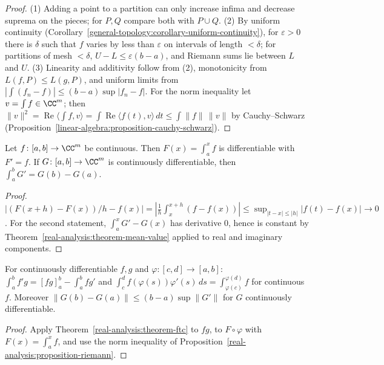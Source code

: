 \begin{proof}
(1) Adding a point to a partition can only increase infima and decrease suprema on the pieces; for $P, Q$ compare both with $P \cup Q$. (2) By uniform continuity
(Corollary~\ref{general-topology:corollary-uniform-continuity}), for $\varepsilon > 0$ there is $\delta$ such that $f$ varies by less than $\varepsilon$ on intervals of length $< \delta$; for partitions of mesh
$< \delta$, $U - L \leq \varepsilon(b - a)$, and Riemann sums lie between $L$ and $U$. (3) Linearity and additivity follow from (2), monotonicity from $L(f, P) \leq L(g, P)$, and uniform limits from
$|\int(f_n - f)| \leq (b - a)\sup|f_n - f|$. For the norm inequality let $v = \int f \in \CC^m$; then
$\|v\|^2 = \operatorname{Re}\langle \int f, v \rangle = \int\operatorname{Re}\langle f(t), v \rangle\,dt \leq \int\|f\|\,\|v\|$ by Cauchy--Schwarz (Proposition~\ref{linear-algebra:proposition-cauchy-schwarz}).
\end{proof}

\begin{theorem}\label{real-analysis:theorem-ftc}
Let $f \colon [a, b] \to \CC^m$ be continuous. Then $F(x) = \int_a^xf$ is differentiable with $F' = f$. If $G \colon [a, b] \to \CC^m$ is continuously differentiable, then $\int_a^bG' = G(b) - G(a)$.
\end{theorem}

\begin{proof}
$|(F(x + h) - F(x))/h - f(x)| = |\frac1h\int_x^{x+h}(f - f(x))| \leq \sup_{|t - x| \leq |h|}|f(t) - f(x)| \to 0$. For the second statement, $\int_a^xG' - G(x)$ has derivative $0$, hence is constant by
Theorem~\ref{real-analysis:theorem-mean-value} applied to real and imaginary components.
\end{proof}

\begin{corollary}\label{real-analysis:corollary-integration-rules}
For continuously differentiable $f, g$ and $\varphi \colon [c, d] \to [a, b]$: $\int_a^bf'g = [fg]_a^b - \int_a^bfg'$ and $\int_c^df(\varphi(s))\varphi'(s)\,ds = \int_{\varphi(c)}^{\varphi(d)}f$ for continuous $f$.
Moreover $\|G(b) - G(a)\| \leq (b - a)\sup\|G'\|$ for $G$ continuously differentiable.
\end{corollary}

\begin{proof}
Apply Theorem~\ref{real-analysis:theorem-ftc} to $fg$, to $F \circ \varphi$ with $F(x) = \int_a^xf$, and use the norm inequality of Proposition~\ref{real-analysis:proposition-riemann}.
\end{proof}

